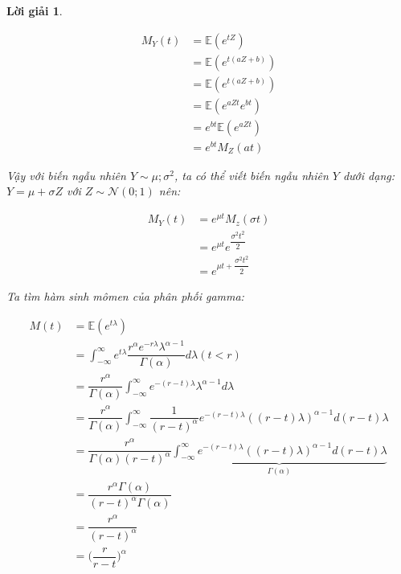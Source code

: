 \documentclass[14pt, a4paper]{article}
\theoremstyle{sltheorem}
\theoremstyle{soltheorem}
\newtheorem*{loigiai}{Lời giải}
\begin{document}
\begin{loigiai}
\begin{enumerate}
        \begin{equation*}
            \begin{aligned}
                M_Y (t) &= \mathbb{E} (e^{tZ}) \\
                &= \mathbb{E} (e^{t(aZ + b)}) \\
                &= \mathbb{E} (e^{t(aZ + b)}) \\
                &= \mathbb{E} (e^{aZt}e^{bt}) \\
                &= e^{bt} \mathbb{E}(e^{aZt}) \\
                &= e^{bt} M_Z(at)
            \end{aligned}
        \end{equation*}

        Vậy với biến ngẫu nhiên $Y \sim \mathcal{\mu; \sigma^2}$, ta có thể viết biến ngẫu nhiên $Y$ dưới dạng: $Y = \mu + \sigma Z$ với $Z \sim \mathcal{N}(0;1)$ nên:

        \begin{equation*}
            \begin{aligned}
                M_Y(t) &= e^{\mu t} M_z(\sigma t) \\
                &= e^{\mu t} e^{\dfrac{\sigma^2 t^2}{2}} \\
                &= e^{\mu t + \dfrac{\sigma^2 t^2}{2}}
            \end{aligned}
        \end{equation*}

        Ta tìm hàm sinh mômen của phân phối gamma:

        \begin{equation*}
            \begin{aligned}
                M(t) &= \mathbb{E}(e^{t\lambda}) \\
                &= \int_{-\infty}^{\infty} e^{t\lambda} \dfrac{r^{\alpha}e^{-r\lambda} \lambda^{\alpha-1}}{\Gamma(\alpha)} d\lambda (t < r) \\
                &= \dfrac{r^{\alpha}}{\Gamma(\alpha)} \int_{-\infty}^{\infty} e^{-(r-t)\lambda} \lambda^{\alpha-1} d \lambda \\
                &= \dfrac{r^{\alpha}}{\Gamma(\alpha)} \int_{-\infty}^{\infty} \dfrac{1}{(r-t)^{\alpha}} e^{-(r-t)\lambda} ((r-t)\lambda)^{\alpha-1} d (r-t)\lambda \\
                &= \dfrac{r^{\alpha}}{\Gamma(\alpha)(r-t)^{\alpha}} \underbrace{\int_{-\infty}^{\infty} e^{-(r-t)\lambda} ((r-t)\lambda)^{\alpha-1} d (r-t)\lambda}_{\Gamma(\alpha)} \\
                &= \dfrac{r^{\alpha} \Gamma(\alpha)}{(r-t)^{\alpha}\Gamma(\alpha)} \\
                &= \dfrac{r^{\alpha}}{(r-t)^{\alpha}} \\
                &= \Big( \dfrac{r}{r-t} \Big)^{\alpha}
            \end{aligned}
        \end{equation*}


\end{enumerate}
\end{loigiai}
\end{document}
